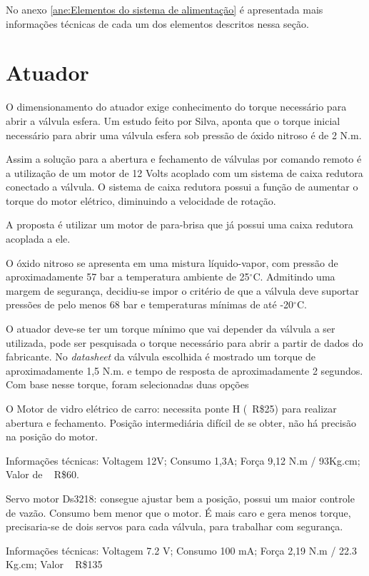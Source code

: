  
\par No anexo \ref{ane:Elementos do sistema de alimentação} é apresentada mais informações técnicas de cada um dos elementos descritos nessa seção.

\section{Atuador}

\par O dimensionamento do atuador exige conhecimento do torque necessário para abrir a válvula esfera. Um estudo feito por Silva, aponta que o torque inicial necessário para abrir uma válvula esfera sob pressão de óxido nitroso é de 2 N.m.
\par Assim a solução para a abertura e fechamento de válvulas por comando remoto é a utilização de um motor de 12 Volts acoplado com um sistema de caixa redutora conectado a válvula. O sistema de caixa redutora possui a função de aumentar o torque do motor elétrico, diminuindo a velocidade de rotação.
\par A proposta é utilizar um motor de para-brisa que já possui uma caixa redutora acoplada a ele. 

\par O óxido nitroso se apresenta em uma mistura líquido-vapor, com pressão de aproximadamente 57 bar a temperatura ambiente de 25$^{\circ}$C. Admitindo uma margem de segurança, decidiu-se impor o critério de que a válvula deve suportar pressões de pelo menos 68 bar e temperaturas mínimas de até -20$^{\circ}$C. 

\par O atuador deve-se ter um torque mínimo que vai depender da válvula a ser utilizada, pode ser pesquisada o torque necessário para abrir a partir de dados do fabricante. No \textit{datasheet} da válvula escolhida é mostrado um torque de aproximadamente 1,5 N.m. e tempo de resposta de aproximadamente 2 segundos. Com base nesse torque, foram selecionadas duas opções
\par O Motor de vidro elétrico de carro: necessita ponte H (~R\$25) para realizar abertura e fechamento. Posição intermediária difícil de se obter, não há precisão na posição do motor. 
\par Informações técnicas: Voltagem 12V; Consumo 1,3A; Força 9,12 N.m / 93Kg.cm; Valor de ~ R\$60.

\par Servo motor Ds3218: consegue ajustar bem a posição, possui um maior controle de vazão. Consumo bem menor que o motor. É mais caro e gera menos torque, precisaria-se de dois servos para cada válvula, para trabalhar com segurança.
\par Informações técnicas: Voltagem 7.2 V; Consumo 100 mA; Força 2,19 N.m / 22.3 Kg.cm; Valor ~ R\$135


